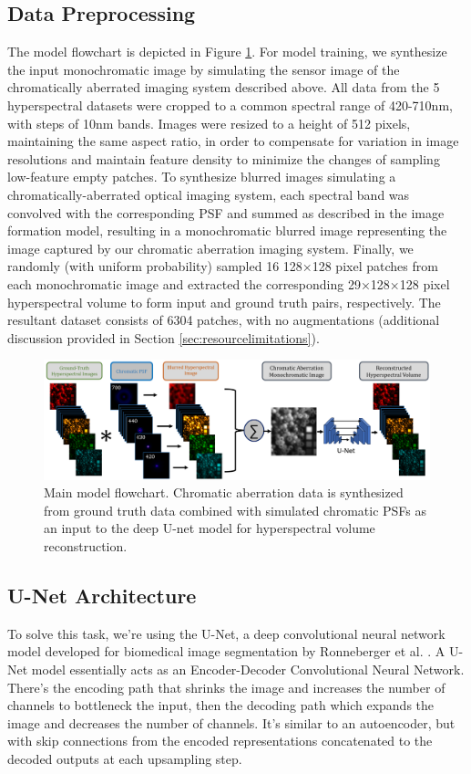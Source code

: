 \documentclass{article}
\begin{document}
\subsection{Data Preprocessing}
The model flowchart is depicted in Figure \ref{fig:mainflow}. For model training, we synthesize the input monochromatic image by simulating the sensor image of the chromatically aberrated imaging system described above. All data from the 5 hyperspectral datasets were cropped to a common spectral range of 420-710nm, with steps of 10nm bands. Images were resized to a height of 512 pixels, maintaining the same aspect ratio, in order to compensate for variation in image resolutions and maintain feature density to minimize the changes of sampling low-feature empty patches. To synthesize blurred images simulating a chromatically-aberrated optical imaging system, each spectral band was convolved with the corresponding PSF and summed as described in the image formation model, resulting in a monochromatic blurred image representing the image captured by our chromatic aberration imaging system. Finally, we randomly (with uniform probability) sampled 16 128×128 pixel patches from each monochromatic image and extracted the corresponding 29×128×128 pixel hyperspectral volume to form input and ground truth pairs, respectively. The resultant dataset consists of 6304 patches, with no augmentations (additional discussion provided in Section \ref{sec:resourcelimitations}).

\begin{figure}
    \centering
    \includegraphics[width=\textwidth]{figs/mainflow.png}
    \caption{Main model flowchart. Chromatic aberration data is synthesized from ground truth data combined with simulated chromatic PSFs as an input to the deep U-net model for hyperspectral volume reconstruction.}
    \label{fig:mainflow}
\end{figure}


\subsection{U-Net Architecture}
To solve this task, we're using the U-Net, a deep convolutional neural network model developed for biomedical image segmentation by Ronneberger et al. \cite{Ronneberger_2018}. A U-Net model essentially acts as an Encoder-Decoder Convolutional Neural Network. There's the encoding path that shrinks the image and increases the number of channels to bottleneck the input, then the decoding path which expands the image and decreases the number of channels. It's similar to an autoencoder, but with skip connections from the encoded representations concatenated to the decoded outputs at each upsampling step.
\end{document}
